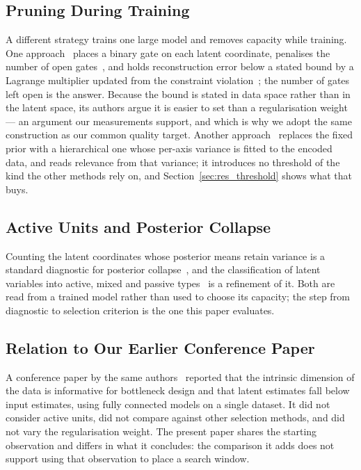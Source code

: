 \documentclass[make,article,submit,pdftex,moreauthors]{Definitions/mdpi}
\begin{document}
\subsection{Pruning During Training}\label{sec:rel_prune}

A different strategy trains one large model and removes capacity while
training. One approach~\cite{deboom2020geco} places a binary gate on each latent
coordinate, penalises the number of open gates~\cite{louizos2018l0}, and holds reconstruction error below a
stated bound by a Lagrange multiplier updated from the constraint
violation~\cite{rezende2018geco}; the number of gates left open is the answer. Because the bound
is stated in data space rather than in the latent space, its authors argue
it is easier to set than a regularisation weight --- an argument our
measurements support, and which is why we adopt the same construction as
our common quality target. Another approach~\cite{saha2025ardvae} replaces the fixed prior with
a hierarchical one whose per-axis variance is fitted to the encoded data,
and reads relevance from that variance; it introduces no threshold of the
kind the other methods rely on, and Section~\ref{sec:res_threshold} shows
what that buys.

\subsection{Active Units and Posterior Collapse}\label{sec:rel_au}

Counting the latent coordinates whose posterior means retain variance is a
standard diagnostic for posterior collapse~\cite{burda2016iwae,lucas2019elbo}, and the classification of latent variables into active, mixed and passive
types~\cite{bonheme2023active} is a refinement of it. Both are read from a trained model rather than used to choose its
capacity; the step from diagnostic to selection criterion is the one this
paper evaluates.

\subsection{Relation to Our Earlier Conference Paper}\label{sec:rel_nolta}

A conference paper by the same authors~\cite{obata2025manifold} reported that the intrinsic
dimension of the data is informative for bottleneck design and that latent
estimates fall below input estimates, using fully connected models on a
single dataset. It did not consider active units, did not compare against
other selection methods, and did not vary the regularisation weight. The
present paper shares the starting observation and differs in what it
concludes: the comparison it adds does not support using that observation
to place a search window.
\end{document}
